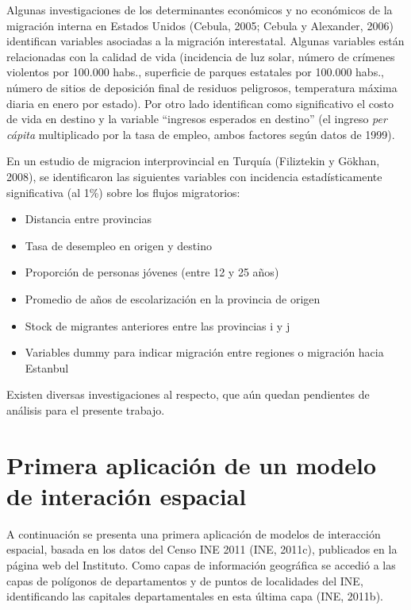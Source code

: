 \documentclass[12pt,spanish,]{article}
\providecommand{\tightlist}{%
  \setlength{\itemsep}{0pt}\setlength{\parskip}{0pt}}
\begin{document}
Algunas investigaciones de los determinantes económicos y no económicos
de la migración interna en Estados Unidos (Cebula, 2005; Cebula y
Alexander, 2006) identifican variables asociadas a la migración
interestatal. Algunas variables están relacionadas con la calidad de
vida (incidencia de luz solar, número de crímenes violentos por 100.000
habs., superficie de parques estatales por 100.000 habs., número de
sitios de deposición final de residuos peligrosos, temperatura máxima
diaria en enero por estado). Por otro lado identifican como
significativo el costo de vida en destino y la variable ``ingresos
esperados en destino'' (el ingreso \emph{per cápita} multiplicado por la
tasa de empleo, ambos factores según datos de 1999).

En un estudio de migracion interprovincial en Turquía (Filiztekin y
Gökhan, 2008), se identificaron las siguientes variables con incidencia
estadísticamente significativa (al 1\%) sobre los flujos migratorios:

\begin{itemize}
\tightlist
\item
  Distancia entre provincias
\item
  Tasa de desempleo en origen y destino
\item
  Proporción de personas jóvenes (entre 12 y 25 años)
\item
  Promedio de años de escolarización en la provincia de origen
\item
  Stock de migrantes anteriores entre las provincias i y j
\item
  Variables dummy para indicar migración entre regiones o migración
  hacia Estanbul
\end{itemize}

Existen diversas investigaciones al respecto, que aún quedan pendientes
de análisis para el presente trabajo.

\hypertarget{primera-aplicaciuxf3n-de-un-modelo-de-interaciuxf3n-espacial}{%
\section{Primera aplicación de un modelo de interación
espacial}\label{primera-aplicaciuxf3n-de-un-modelo-de-interaciuxf3n-espacial}}

A continuación se presenta una primera aplicación de modelos de
interacción espacial, basada en los datos del Censo INE 2011 (INE,
2011c), publicados en la página web del Instituto. Como capas de
información geográfica se accedió a las capas de polígonos de
departamentos y de puntos de localidades del INE, identificando las
capitales departamentales en esta última capa (INE, 2011b).
\end{document}
